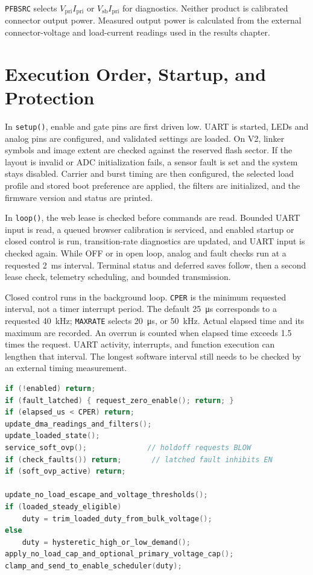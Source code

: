 \texttt{PFBSRC} selects \(V_{\mathrm{pri}}I_{\mathrm{pri}}\) or \(V_{\mathrm{sb}}I_{\mathrm{pri}}\) for diagnostics. Neither product is calibrated connector output power. Measured output power is calculated from the external connector-voltage and load-current readings used in the results chapter.

\section{Execution Order, Startup, and Protection}
\label{sec:app-fw-execution}

In \texttt{setup()}, enable and gate pins are first driven low. UART is started, LEDs and analog pins are configured, and validated settings are loaded. On V2, linker symbols and image extent are checked against the reserved flash sector. If the layout is invalid or ADC initialization fails, a sensor fault is set and the system stays disabled. Carrier and burst timing are then configured, the selected load profile and stored boot preference are applied, the filters are initialized, and the firmware version and status are printed.

In \texttt{loop()}, the web lease is checked before commands are read. Bounded UART input is read, a queued browser calibration is serviced, and enabled startup or closed control is run, transition-rate diagnostics are updated, and UART input is checked again. While OFF or in open loop, analog and fault checks run at a requested \SI{2}{\milli\second} interval. Terminal status and deferred saves follow, then a second lease check, telemetry scheduling, and bounded transmission.

Closed control runs in the background loop. \texttt{CPER} is the minimum requested interval, not a timer interrupt period. The default \SI{25}{\micro\second} corresponds to a requested \SI{40}{\kilo\hertz}; \texttt{MAXRATE} selects \SI{20}{\micro\second}, or \SI{50}{\kilo\hertz}. Actual elapsed time and its maximum are recorded. An overrun is counted when elapsed time exceeds 1.5 times the request. UART activity, interrupts, and function execution can lengthen that interval. The longest software interval still needs to be checked by an external timing measurement.

\begin{lstlisting}[language=C,basicstyle=\ttfamily\scriptsize,caption={Decision order shared by the baseline and V2 voltage-control paths. BLOW defaults to zero.},label={lst:app-pwr1920}]
if (!enabled) return;
if (fault_latched) { request_zero_enable(); return; }
if (elapsed_us < CPER) return;
update_dma_readings_and_filters();
update_loaded_state();
service_soft_ovp();              // holdoff requests BLOW
if (check_faults()) return;       // latched fault inhibits EN
if (soft_ovp_active) return;

update_no_load_escape_and_voltage_thresholds();
if (loaded_steady_eligible)
    duty = trim_loaded_duty_from_bulk_voltage();
else
    duty = hysteretic_high_or_low_demand();
apply_no_load_cap_and_optional_primary_voltage_cap();
clamp_and_send_to_enable_scheduler(duty);
\end{lstlisting}

